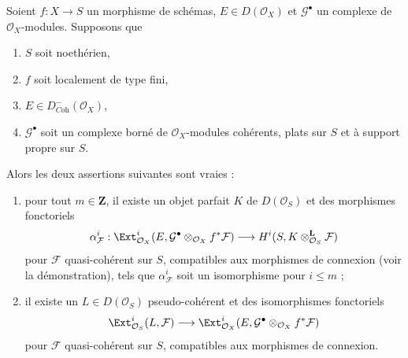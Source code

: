 \begin{lemma}
\label{lemma-compute-ext}
Soient $f : X \to S$ un morphisme de schémas, $E \in D(\mathcal{O}_X)$
et $\mathcal{G}^\bullet$ un complexe de $\mathcal{O}_X$-modules.
Supposons que
\begin{enumerate}
\item $S$ soit noethérien,
\item $f$ soit localement de type fini,
\item $E \in D^-_{\textit{Coh}}(\mathcal{O}_X)$,
\item $\mathcal{G}^\bullet$ soit un complexe borné de
$\mathcal{O}_X$-modules cohérents, plats sur $S$ et à support propre sur $S$.
\end{enumerate}
Alors les deux assertions suivantes sont vraies :
\begin{enumerate}
\item[(A)] pour tout $m \in \mathbf{Z}$, il existe un objet parfait $K$
de $D(\mathcal{O}_S)$ et des morphismes fonctoriels
$$
\alpha^i_\mathcal{F} :
\Ext^i_{\mathcal{O}_X}(E,
\mathcal{G}^\bullet \otimes_{\mathcal{O}_X} f^*\mathcal{F})
\longrightarrow
H^i(S, K \otimes^\mathbf{L}_{\mathcal{O}_S} \mathcal{F})
$$
pour $\mathcal{F}$ quasi-cohérent sur $S$, compatibles aux morphismes de connexion
(voir la démonstration), tels que $\alpha^i_\mathcal{F}$ soit un isomorphisme pour $i \leq m$ ;
\item[(B)] il existe un $L \in D(\mathcal{O}_S)$ pseudo-cohérent
et des isomorphismes fonctoriels
$$
\Ext^i_{\mathcal{O}_S}(L, \mathcal{F}) \longrightarrow
\Ext^i_{\mathcal{O}_X}(E,
\mathcal{G}^\bullet \otimes_{\mathcal{O}_X} f^*\mathcal{F})
$$
pour $\mathcal{F}$ quasi-cohérent sur $S$, compatibles aux morphismes de connexion.
\end{enumerate}
\end{lemma}

